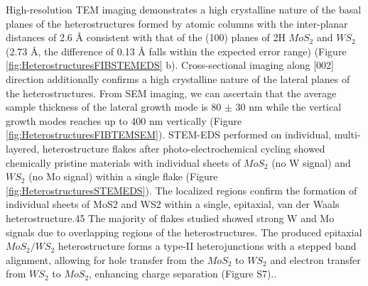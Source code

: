 High-resolution TEM imaging demonstrates a high crystalline nature of the basal planes of the heterostructures formed by atomic columns with the inter-planar distances of 2.6 \r{A} consistent with that of the (100) planes of 2H $MoS_2$ and $WS_2$ (2.73 \r{A}, the difference of 0.13 \r{A} falls within the expected error range) (Figure \ref{fig:HeterostructuresFIBSTEMEDS} b). Cross-sectional imaging along [002] direction additionally confirms a high crystalline nature of the lateral planes of the heterostructures. From SEM imaging, we can ascertain that the average sample thickness of the lateral growth mode is 80 $\pm$ 30 nm while the vertical growth modes reaches up to 400 nm vertically (Figure \ref{fig:HeterostructuresFIBTEMSEM}). STEM-EDS performed on individual, multi-layered, heterostructure flakes after photo-electrochemical cycling showed chemically pristine materials with individual sheets of $MoS_2$ (no W signal) and $WS_2$ (no Mo signal) within a single flake (Figure \ref{fig:HeterostructuresSTEMEDS}). The localized regions confirm the formation of individual sheets of MoS2 and WS2 within a single, epitaxial, van der Waals heterostructure.45 The majority of flakes studied showed strong W and Mo signals due to overlapping regions of the heterostructures. The produced epitaxial $MoS_2/WS_2$ heterostructure forms a type-II heterojunctions with a stepped band alignment, allowing for hole transfer from the $MoS_2$ to $WS_2$ and electron transfer from $WS_2$ to $MoS_2$, enhancing charge separation (Figure S7).\cite{Zhuang2013}\cite{Hong2014}\cite{Ma2018}. 